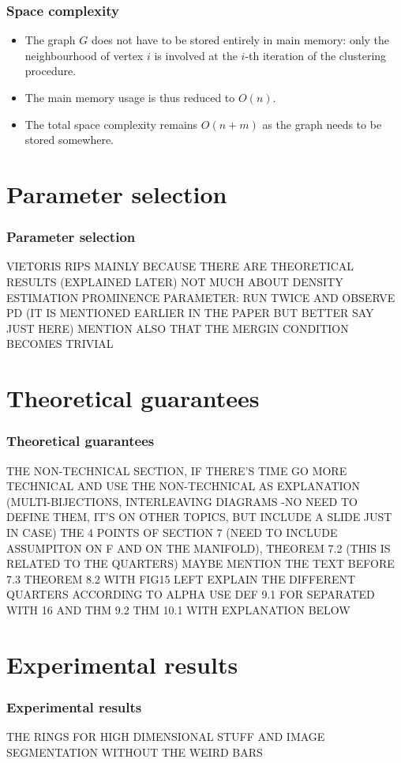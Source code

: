 \documentclass{beamer}
\theoremstyle{definition}
\begin{document}
\begin{frame}
\frametitle{Space complexity}
\begin{itemize}
\item<1-> The graph $G$ does not have to be stored entirely in main memory: only the neighbourhood of vertex $i$ is involved at the
$i$-th iteration of the clustering procedure. 

\item<2-> The main memory usage is thus reduced to $O(n)$.

\item<3-> The total space complexity remains $O(n + m)$ as the graph needs to be stored somewhere.
\end{itemize}
\end{frame}

\section{Parameter selection}
\begin{frame}
\frametitle{Parameter selection}
VIETORIS RIPS MAINLY BECAUSE THERE ARE THEORETICAL RESULTS (EXPLAINED LATER)
NOT MUCH ABOUT DENSITY ESTIMATION
PROMINENCE PARAMETER: RUN TWICE AND OBSERVE PD (IT IS MENTIONED EARLIER IN THE PAPER BUT BETTER SAY JUST HERE) MENTION ALSO THAT THE MERGIN CONDITION BECOMES TRIVIAL
\end{frame}

\section{Theoretical guarantees}
\begin{frame}
\frametitle{Theoretical guarantees}
THE NON-TECHNICAL SECTION, IF THERE'S TIME GO MORE TECHNICAL AND USE THE NON-TECHNICAL AS EXPLANATION (MULTI-BIJECTIONS, INTERLEAVING DIAGRAMS -NO NEED TO DEFINE THEM, IT'S ON OTHER TOPICS, BUT INCLUDE A SLIDE JUST IN CASE)
THE 4 POINTS OF SECTION 7 (NEED TO INCLUDE ASSUMPITON ON F AND ON THE MANIFOLD), THEOREM 7.2 (THIS IS RELATED TO THE QUARTERS) MAYBE MENTION THE TEXT BEFORE 7.3
THEOREM 8.2 WITH FIG15 LEFT
EXPLAIN THE DIFFERENT QUARTERS ACCORDING TO ALPHA
USE DEF 9.1 FOR SEPARATED WITH 16 AND THM 9.2
THM 10.1 WITH EXPLANATION BELOW
\end{frame}

\section{Experimental results}
\begin{frame}
\frametitle{Experimental results}
THE RINGS FOR HIGH DIMENSIONAL STUFF AND IMAGE SEGMENTATION WITHOUT THE WEIRD BARS
\end{frame}
\end{document}
